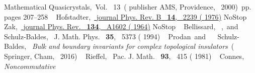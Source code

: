 \documentclass[
    10pt,
    aps,
    prb,
    twocolumn,
    floatfix,
    superscriptaddress,
]{revtex4-2}
\begin{document}
\begin{thebibliography}{41}
{{{	  Mathematical Quasicrystals}}},\ Vol.~ {13}\ (\bibinfo
	  {publisher} {AMS, Providence},\  {2000})\ pp.\ \bibinfo
	  {pages} {207--258}%
	  \BibitemOpen
	   { {\ \bibnamefont
	  {Hofstadter}},\ }\href {https://doi.org/10.1103/PhysRevB.14.2239} {\bibfield
	  {journal} { {Phys. Rev. B}\ }\textbf {
	  {14}},\  {2239} ( {1976})}\BibitemShut
	  {NoStop}%
	  \BibitemOpen
	   { {~\bibnamefont
	  {Zak}},\ }\href {https://doi.org/10.1103/PhysRev.134.A1602} {\bibfield
	  {journal} { {Phys. Rev.}\ }\textbf {
	  {134}},\  {A1602} ( {1964})}\BibitemShut
	  {NoStop}%
	  \BibitemOpen
	   { {~\bibnamefont
	  {Bellissard}},  {~},\ and\  {~\bibnamefont
	  {Schulz-Baldes}},\ }\href@noop {} { {
	  {J. Math. Phys.}\ }\textbf { {35}},\  {5373}
	  ( {1994})}%
	  \BibitemOpen
	   { {~\bibnamefont
	  {Prodan}}\ and\  {~\bibnamefont
	  {Schulz-Baldes}},\ }\href@noop {} {\emph { {Bulk and boundary
	  invariants for complex topological insulators}}}\ (
	  {Springer, Cham},\  {2016})%
	  \BibitemOpen
	   { {~\bibnamefont
	  {Rieffel}},\ }\href@noop {} { { {Pac.
	  J. Math.}\ }\textbf { {93}},\  {415}
	  ( {1981})}%
	  \BibitemOpen
	   { {~\bibnamefont
	  {Connes}},\ }\href@noop {} {\emph { {Noncommutative
}}}
\end{thebibliography}
\end{document}
